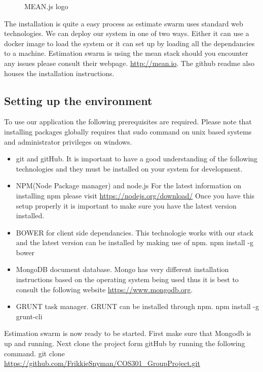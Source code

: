\begin{figure}[H]
	    	\centering
	    	\caption{MEAN.js logo}
	    	\label{fig:MEAN}
   	\end{figure}
The installation is quite a easy process as estimate swarm uses standard web technologies. We can deploy our system in one of two ways. Either it can use a docker image to load the system or it can set up by loading all the dependancies to a machine. Estimation swarm is using the mean stack should you encounter any issues please consult their webpage. \url{http://mean.io}. The github readme also houses the installation instructions.
\subsection{Setting up the environment}
To use our application the following prerequisites are required. Please note that installing packages globally requires that sudo command on unix based systems and administrator privileges on windows.
\begin{itemize}
	\item git and gitHub. It is important to have a good understanding of the following technologies and they must be installed on your system for development.
	\item NPM(Node Package manager) and node.js 
	For the latest information on installing npm please visit \url{https://nodejs.org/download/} Once you have this setup properly it is important to make sure you have the latest version installed.
	\item BOWER for client side dependancies.
	This technologie works with our stack and the latest version can be installed by making use of npm.
	\newline
	npm install -g bower 
	\item MongoDB document database. Mongo has very different installation instructions based on the operating system being used thus it is best to consult the following website \url{https://www.mongodb.org}.
	\item GRUNT task manager. GRUNT can be installed through npm. 
	\newline
	npm install -g grunt-cli
\end{itemize}
Estimation swarm is now ready to be started. First make sure that Mongodb is up and running. Next clone the project form gitHub by running the following command.
\newline
git clone \url{https://github.com/FrikkieSnyman/COS301_GroupProject.git}

